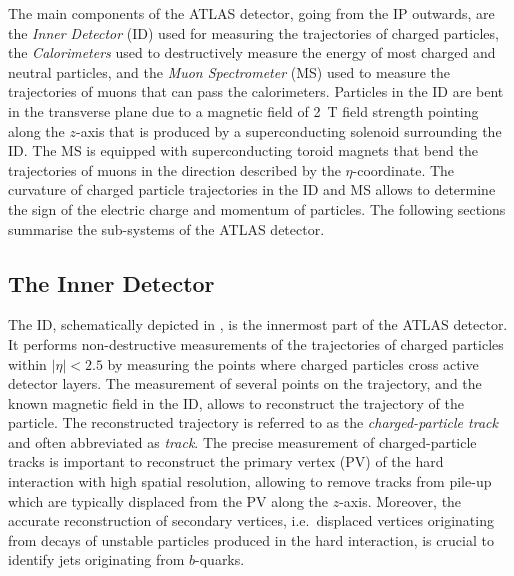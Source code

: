 The main components of the ATLAS detector, going from the IP outwards, are the
\emph{Inner Detector} (ID) used for measuring the trajectories of charged
particles, the \emph{Calorimeters} used to destructively measure the energy of
most charged and neutral particles, and the \emph{Muon Spectrometer} (MS) used
to measure the trajectories of muons that can pass the calorimeters. Particles
in the ID are bent in the transverse plane due to a magnetic field of
\SI{2}{\tesla} field strength pointing along the $z$-axis that is produced by a
superconducting solenoid surrounding the ID.  The MS is equipped with
superconducting toroid magnets that bend the trajectories of muons in the
direction described by the $\eta$-coordinate. The curvature of charged particle
trajectories in the ID and MS allows to determine the sign of the electric
charge and momentum of particles. The following sections summarise the
sub-systems of the ATLAS detector.


\subsection{The Inner Detector}

The ID, schematically depicted in , is the
innermost part of the ATLAS detector. It performs non-destructive measurements
of the trajectories of charged particles within $|\eta| < 2.5$ by measuring the
points where charged particles cross active detector layers. The measurement of
several points on the trajectory, and the known magnetic field in the ID, allows
to reconstruct the trajectory of the particle. The reconstructed trajectory is
referred to as the \emph{charged-particle track} and often abbreviated as
\emph{track}. The precise measurement of charged-particle tracks is important to
reconstruct the primary vertex (PV) of the hard interaction with high spatial
resolution, allowing to remove tracks from pile-up which are typically displaced
from the PV along the $z$-axis. Moreover, the accurate reconstruction of
secondary vertices, i.e.\ displaced vertices originating from decays of unstable
particles produced in the hard interaction, is crucial to identify jets
originating from $b$-quarks.%

